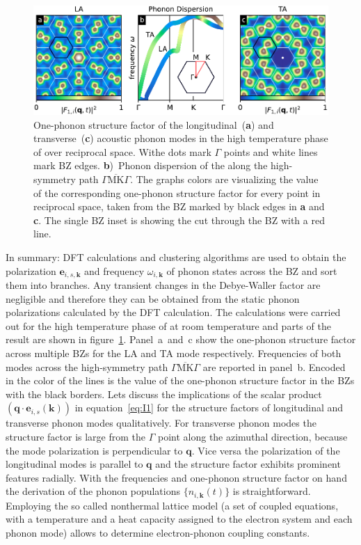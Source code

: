 \begin{figure}[!t]
	\includegraphics[width=\columnwidth]{figs/ops.pdf}
	\caption{One-phonon structure factor of the longitudinal~(\textbf{a}) and transverse~(\textbf{c}) acoustic phonon modes in the high temperature phase of \ts over reciprocal space. Withe dots mark $\Gamma$ points and white lines mark \ac{BZ} edges. \textbf{b})~Phonon dispersion of the along the high-symmetry path $\overline{\Gamma\mathrm{MK}\Gamma}$. The graphs colors are visualizing the value of the corresponding one-phonon structure factor for every point in reciprocal space, taken from the \ac{BZ} marked by black edges in \textbf{a} and \textbf{c}. The single \ac{BZ} inset is showing the cut through the \ac{BZ} with a red line.}
	\label{fig:ops}
\end{figure}

In summary: \Ac{DFT} calculations and clustering algorithms are used to obtain the polarization $\mathbf{e}_{i,s,\mathbf{k}}$ and frequency $\omega_{i,\mathbf{k}}$ of phonon states across the \ac{BZ} and sort them into branches.
Any transient changes in the Debye-Waller factor are negligible and therefore they can be obtained from the static phonon polarizations calculated by the \ac{DFT} calculation.
The calculations were carried out for the high temperature phase of \ts at room temperature and parts of the result are shown in figure~\ref{fig:ops}.
Panel~a~and~c show the one-phonon structure factor across multiple \acp{BZ} for the \ac{LA} and \ac{TA} mode respectively.
Frequencies of both modes across the high-symmetry path $\overline{\Gamma\mathrm{MK}\Gamma}$ are reported in panel~b.
Encoded in the color of the lines is the value of the one-phonon structure factor in the \acp{BZ} with the black borders.
Lets discuss the implications of the scalar product $\left( \mathbf{q}\cdot\mathbf{e}_{i, s}(\mathbf{k}) \right)$ in equation~\ref{eq:I1} for the structure factors of longitudinal and transverse phonon modes qualitatively.
For transverse phonon modes the structure factor is large from the $\Gamma$ point along the azimuthal direction, because the mode polarization is perpendicular to $\mathbf{q}$.
Vice versa the polarization of the longitudinal modes is parallel to $\mathbf{q}$ and the structure factor exhibits prominent features radially.
With the frequencies and one-phonon structure factor on hand the derivation of the phonon populations $\{n_{i,\mathbf{k}}(t)\}$ is straightforward.
Employing the so called nonthermal lattice model\cite{waldecker2016} (a set of coupled equations, with a temperature and a heat capacity assigned to the electron system and each phonon mode) allows to determine electron-phonon coupling constants.

